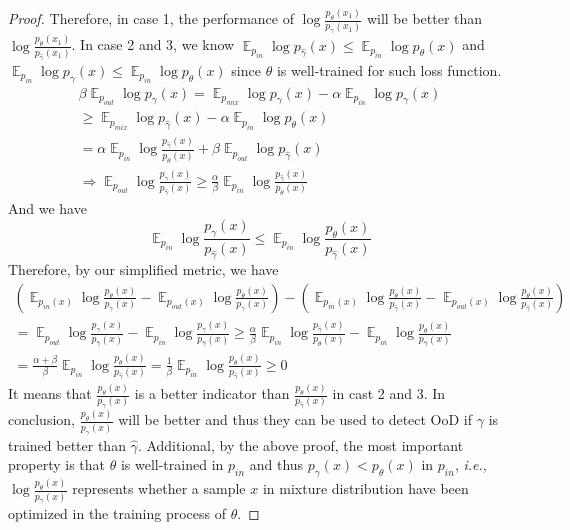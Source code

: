 \documentclass[a3paper]{article}
\newtheorem*{proof}{\it{Proof.}\rm}
\newcommand{\IE}{\textit{i.e.}, }
\newcommand{\E}{\operatorname{\mathbb{E}}}
\newcommand{\pin}{p_{in}}
\newcommand{\pout}{p_{out}}
\newcommand{\pmix}{p_{mix}}
\begin{document}
\begin{proof}
	Therefore, in case 1, the performance of $\log \frac{p_\theta(x_1)}{p_{\gamma}(x_1)}$ will be better than $\log \frac{p_\theta(x_1)}{p_{\hat\gamma}(x_1)}$. In case 2 and 3, we know $\E_{\pin} \log p_{\hat\gamma}(x) \leq \E_{\pin} \log p_\theta(x)$ and $\E_{\pin} \log p_\gamma(x) \leq \E_{\pin} \log p_\theta(x)$ since $\theta$ is well-trained for such loss function. 
	\begin{align*}
		\beta \E_{\pout} \log p_\gamma(x) = \E_{\pmix} \log p_\gamma(x) - \alpha \E_{\pin} \log p_\gamma(x) \\
		\geq \E_{\pmix} \log p_{\hat\gamma}(x) - \alpha \E_{\pin} \log p_\theta(x) \\
		= \alpha \E_{\pin} \log \frac{p_{\hat \gamma}(x)}{p_\theta(x)} + \beta \E_{\pout} \log p_{\hat \gamma}(x) \\
	\Rightarrow \E_{\pout} \log \frac{p_\gamma(x)}{p_{\hat\gamma}(x)} \geq \frac{\alpha}{\beta} \E_{\pin} \log \frac{p_{\hat \gamma}(x)}{p_\theta(x)}
	\end{align*}
	And we have 
	\begin{equation*}
		\E_{\pin} \log \frac{p_\gamma(x)}{p_{\hat\gamma}(x)} \leq \E_{\pin} \log \frac{p_\theta(x)}{p_{\hat\gamma}(x)}
	\end{equation*}
	Therefore, by our simplified metric, we have
	\begin{align*}
		(\E_{\pin(x)} \log \frac{p_\theta(x)}{p_{{\gamma}}(x)} - \E_{\pout(x)} \log \frac{p_\theta(x)}{p_{{\gamma}}(x)}) - (\E_{\pin(x)} \log \frac{p_\theta(x)}{p_{{\hat\gamma}}(x)} - \E_{\pout(x)} \log \frac{p_\theta(x)}{p_{\hat\gamma}(x)}) \\
		=  \E_{\pout} \log \frac{p_\gamma(x)}{p_{\hat\gamma}(x)} -\E_{\pin} \log \frac{p_{\gamma}(x)}{p_{\hat\gamma}(x)}\geq \frac{\alpha}{\beta} \E_{\pin} \log \frac{p_{\hat \gamma}(x)}{p_\theta(x)} - \E_{\pin} \log \frac{p_\theta(x)}{p_{\hat\gamma}(x)} \\
		= \frac{\alpha + \beta}{\beta} \E_{\pin} \log \frac{p_\theta(x)}{p_{\hat\gamma}(x)} = \frac{1}{\beta} \E_{\pin} \log \frac{p_\theta(x)}{p_{\hat\gamma}(x)} \geq 0
	\end{align*}
	It means that $\frac{p_\theta(x)}{p_{{\gamma}}(x)}$ is a better indicator than $\frac{p_\theta(x)}{p_{{\hat\gamma}}(x)}$ in cast 2 and 3. In conclusion,  $\frac{p_\theta(x)}{p_{{\gamma}}(x)}$ will be better and thus they can be used to detect OoD if $\gamma$ is trained better than $\hat{\gamma}$. 
	Additional, by the above proof, the most important property is that $\theta$ is well-trained in $\pin$ and thus $p_\gamma(x) < p_\theta(x)$ in $\pin$, \IE $\log \frac{p_\theta(x)}{p_\gamma(x)}$ represents whether a sample $x$ in mixture distribution have been optimized in the training process of $\theta$. 
\end{proof}
\end{document}

